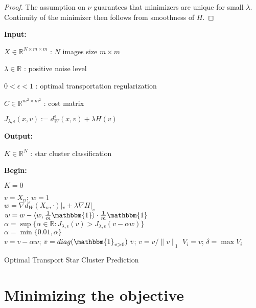 \documentclass[conference]{IEEEtran}
\newcommand{\R}{{\mathbb{R}}}
\newcommand{\bbI}{{\mathbbm{1}}}
\begin{document}
\begin{proof}
    The assumption on $\nu$ guarantees that minimizers are unique for small $\lambda$. Continuity of the minimizer then follows from smoothness of $H$. 
\end{proof}

\begin{algorithm}[h]
    \textbf{Input:} 
    
    \quad $X \in \R^{N \times m \times m}$ : $N$ images size $m \times m$

    \quad $\lambda \in \R$ : positive noise level 

    \quad $0 < \epsilon < 1$ : optimal transportation regularization 

    \quad $C\in\R^{m^2 \times m^2}$ : cost matrix 

    \quad $ J_{\lambda,\epsilon}(x,v) := d_W^\epsilon(x,v) + \lambda H(v) $

    \textbf{Output:}
    
    \quad $K \in \R^N$ : star cluster classification
    
    \textbf{Begin:}
    
    $K = 0$
    
 	{
        $ v = X_n;\ w = 1 $ \\
 	    {
$w = \nabla d_W^\epsilon(X_n,\cdot)|_v + \lambda \nabla H|_v $ \\
$ w = w - \langle w, \frac{1}{m} \bbI \rangle \cdot \frac{1}{m} \bbI $ \\
$ \alpha = \sup\{\alpha \in \R : J_{\lambda,\epsilon}(v) > J_{\lambda,\epsilon}(v - \alpha w) \}$ \\
            $ \alpha = \min\{0.01, \alpha\}$\\
 	        $ v = v - \alpha w $;
 	        $ v = diag(\bbI_{v > 0}) \ v $;
 	        $ v = v/\|v\|_1 $
 	    }
 	    $V_i = v$;
     	$\delta = \max V_i$
     	
  	}
	\caption{Optimal Transport Star Cluster Prediction}
	\label{algo:OT}
\end{algorithm}

\section{Minimizing the objective}
\end{document}
